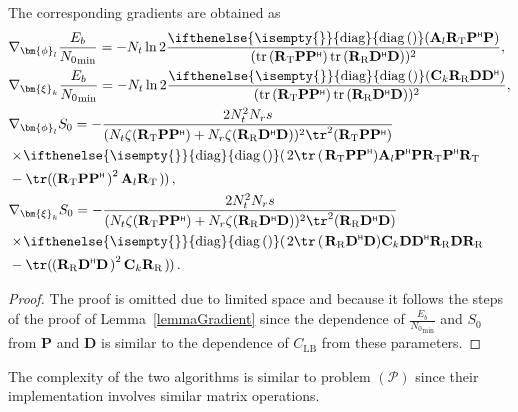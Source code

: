 \documentclass[twocolumn,10pt]{IEEEtran}
\newcommand{\vect}[1]{{\lowercase{\mbs{#1}}}}
\newcommand{\mbs}[1]{\bm{#1}}
\renewcommand{\H}{{\scriptscriptstyle\mathsf{H}}}
\newcommand{\bphi}{\vect{\phi}}
\def\bA{{\mathbf{A}}}
\def\bC{{\mathbf{C}}}
\def\bD{{\mathbf{D}}}
\def\bP{{\mathbf{P}}}
\def\bR{{\mathbf{R}}}
\def\bX{{\mathbf{X}}}
\def\bxi{{\bm{\xi}}}
\def\bxi{{\bm{\xi}}}
\newcommand{\diag}[1][]{\ifthenelse{\isempty{#1}}{\text{diag}}{\text{diag}\left(#1\right)}}
\begin{document}
	The corresponding gradients are obtained as
	\begin{align}
		&\nabla_{\bphi_{l}}	\frac{E_{b}}{{N_{0}}_{\min}}=-N_{t}\ln 2\frac{\diag(\bA_{l}\bR_{\mathrm{T}}\bP^{\H}\bP )}{(\mathrm{tr}\left(\bR_{\mathrm{T}}\bP\bP^{\H}\right)\mathrm{tr}\left(\bR_{\mathrm{R}}\bD^{\H}\bD\right))^{2}},\\
		&	\nabla_{\bxi_{k}}	\frac{E_{b}}{{N_{0}}_{\min}}=-N_{t}\ln 2\frac{\diag(\bC_{k}\bR_{\mathrm{R}}\bD\bD^{\H} )}{(\mathrm{tr}\left(\bR_{\mathrm{T}}\bP\bP^{\H}\right)\mathrm{tr}\left(\bR_{\mathrm{R}}\bD^{\H}\bD\right))^{2}}, \\
		&	\nabla_{\bphi_{l}}	S_{0}=-\frac{2 N_{t}^{2}N_{r} s}{(N_{t} \zeta(\bR_{\mathrm{T}}\bP\bP^{\H})+N_{r}\zeta(\bR_{\mathrm{R}}\bD^{\H}\bD))^{2}\tr^{2}(\bR_{\mathrm{T}}\bP\bP^{\H})}\\
		&\times \!\diag\!\left(\!\right.2 \tr\left(\right.\!\bR_{\mathrm{T}}\bP\bP^{\H})\bA_{l}\bP^{\H}\bP\bR_{\mathrm{T}}\bP^{\H}\bR_{\mathrm{T}} \\
		&-\tr\! \left(\right.\!\!(\bR_{\mathrm{T}}\bP\bP^{\H}\!\left. \right)^{2}\bA_{l}\bR_{\mathrm{T}}\!\left. \right)\!\!\left. \right),\\
		&\nabla_{\bxi_{k}}S_{0}=-\frac{2 N_{t}^{2}N_{r} s}{(N_{t} \zeta(\bR_{\mathrm{T}}\bP\bP^{\H})+N_{r}\zeta(\bR_{\mathrm{R}}\bD^{\H}\bD))^{2}\tr^{2}(\bR_{\mathrm{R}}\bD^{\H}\bD)}\\
		&\times \!\diag\!\left(\!\right.2 \tr\left(\right.\!\bR_{\mathrm{R}}\bD^{\H}\bD)\bC_{k}\bD\bD^{\H}\bR_{\mathrm{R}}\bD\bR_{\mathrm{R}} \\
		&-\tr\! \left(\right.\!\!(\bR_{\mathrm{R}}\bD^{\H}\bD\!\left. \right)^{2}\bC_{k}\bR_{\mathrm{R}}\!\left. \right)\!\!\left. \right).
	\end{align}
	\begin{proof}
		The proof is omitted due to limited space and because it follows the steps of the proof of Lemma~\ref{lemmaGradient} since the dependence of $	\frac{E_{b}}{{N_{0}}_{\min}}$ and $S_{0}$ from $\bP$ and $\bD$ is similar to the dependence  of $C_{\mathrm{LB}}$ from these parameters.	
	\end{proof}
	
	The complexity of the two algorithms is similar to  problem $(\mathcal{P})$ since their implementation involves similar  matrix operations.
\end{document}
